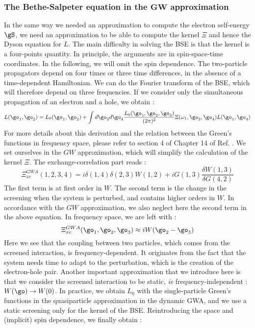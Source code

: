 \subsubsection{The Bethe-Salpeter equation in the $\mathbf{GW}$ approximation}
In the same way we needed an approximation to compute the electron self-energy $\gS$, we need an approximation to be able to compute the kernel $\Xi$ and hence the Dyson equation for $L$. The main difficulty in solving the \gls{BSE} is that the kernel is a four-points quantity. In principle, the arguments are in spin-space-time coordinates. In the following, we will omit the spin dependence. The two-particle propagators depend on four times or three time differences, in the absence of a time-dependent Hamiltonian. We can do the Fourier transform of the BSE, which will therefore depend on three frequencies. If we consider only the simultaneous propagation of an electron and a hole, we obtain :
\begin{equation}
	L(\go_1,\go_2) = L_0(\go_1,\go_2) + \int d\go_3 d\go_4 \frac{L_0(\go_1,\go_2,\go_3)}{(2\pi)^2} \Xi(\omega_1,\go_3,\go_4) L(\go_1,\go_4) \label{eq:BSE_freq}
\end{equation}
For more details about this derivation and the relation between the Green's functions in frequency space, please refer to section 4 of Chapter 14 of Ref. \cite{martin2016interacting}. We set ourselves in the $GW$ approximation, which will simplify the calculation of the kernel $\Xi$. The exchange-correlation part reads :
\begin{equation}
	\Xi^{GWA}_{xc}(1,2,3,4) = i\delta(1,4)\delta(2,3)W(1,2) + iG(1,3)\frac{\delta W(1,3)}{\delta G(4,2)}
\end{equation}
The first term is at first order in $W$. The second term is the change in the screening when the system is perturbed, and contains higher orders in $W$. In accordance with the $GW$ approximation, we also neglect here the second term in the above equation. In frequency space, we are left with :
\begin{equation}
	\Xi^{GWA}_{xc}(\go_1,\go_2,\go_3) \approx iW(\go_2 - \go_3)
\end{equation}
Here we see that the coupling between two particles, which comes from the screened interaction, is frequency-dependent. It originates from the fact that the system needs time to adapt to the perturbation, which is the creation of the electron-hole pair. Another important approximation that we introduce here is that we consider the screened interaction to be static, \textit{ie} frequency-independent : $W(\go) \to W(0)$. In practice, we obtain $L_0$ with the single-particle Green's functions in the quasiparticle approximation in the dynamic \gls{GWA}, and we use a static screening only for the kernel of the \gls{BSE}. Reintroducing the space and (implicit) spin dependence, we finally obtain :

